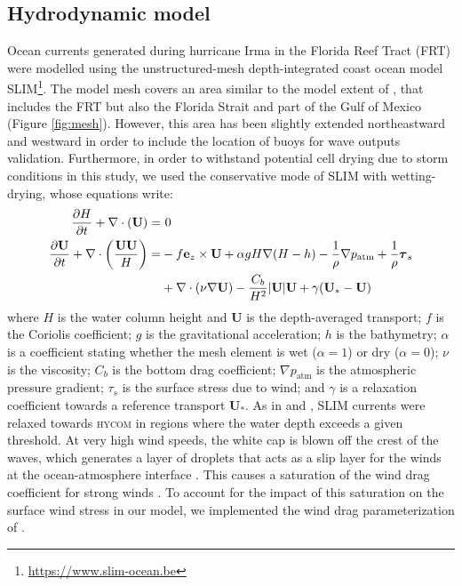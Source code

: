 \documentclass[11pt,a4paper]{article}
\newcommand{\hycom}{\textsc{hycom} }
\newcommand{\UV}{\mathbf{U}}
\begin{document}
\subsection{Hydrodynamic model}
Ocean currents generated during hurricane Irma in the Florida Reef Tract (FRT) were modelled using the unstructured-mesh depth-integrated coast ocean model SLIM\footnote{\url{https://www.slim-ocean.be}}. The model mesh covers an area similar to the model extent of \cite{dobbelaere2020coupled}, that includes the FRT but also the Florida Strait and part of the Gulf of Mexico (Figure \ref{fig:mesh}). However, this area has been slightly extended northeastward and westward in order to include the location of buoys for wave outputs validation. Furthermore, in order to withstand potential cell drying due to storm conditions in this study, we used the conservative mode of SLIM with wetting-drying, whose equations write:
\begin{equation}
    \begin{split}
        \dfrac{\partial H}{\partial t} +\nabla\cdot(\UV) =& ~0 \\
        \dfrac{\partial \UV}{\partial t}  + \nabla\cdot\left(\dfrac{\UV\UV}{H}\right) =& -f\mathbf{e}_z \times \UV + \alpha gH\nabla(H-h) - \dfrac{1}{\rho}\nabla p_\text{atm} + \dfrac{1}{\rho}\text{\boldmath$\tau$}_s \\
         &+\nabla\cdot(\nu\nabla\UV) - \dfrac{C_b}{H^2}|\UV|\UV + \gamma(\UV_\ast-\UV)
    \end{split} \label{eq:slim}
\end{equation}
where $H$ is the water column height and $\UV$ is the depth-averaged transport; $f$ is the Coriolis coefficient; $g$ is the gravitational acceleration; $h$ is the bathymetry; $\alpha$ is a coefficient stating whether the mesh element is wet ($\alpha=1$) or dry ($\alpha=0$); $\nu$  is the viscosity; $C_b$ is the bottom drag coefficient; $\nabla p_\text{atm}$ is the atmospheric pressure gradient; {\boldmath$\tau$}$_s$ is the surface stress due to wind; and $\gamma$ is a relaxation coefficient towards a reference transport $\UV_\ast$. As in \cite{frys2020fine} and \cite{dobbelaere2020coupled}, SLIM currents were relaxed towards \hycom \citep{chassignet2007hycom} in regions where the water depth exceeds a given threshold. At very high wind speeds, the white cap is blown off the crest of the waves, which generates a layer of droplets that acts as a slip layer for the winds at the ocean-atmosphere interface \citep{holthuijsen2012wind}. This causes a saturation of the wind drag coefficient for strong winds \citep{donelan2004limiting,powell2003reduced}. To account for the impact of this saturation on the surface wind stress in our model, we implemented the wind drag parameterization of \cite{moon2007physics}.
\end{document}
